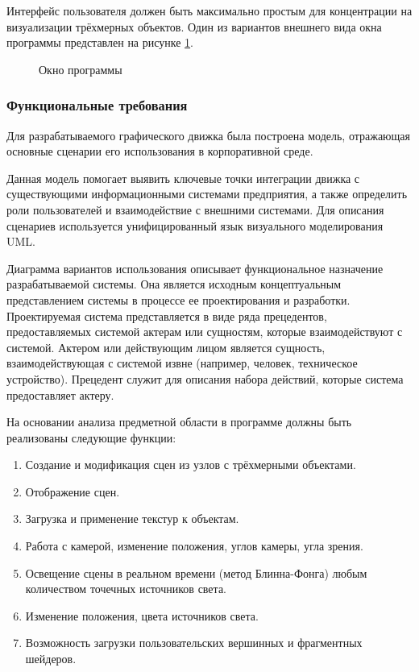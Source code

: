 Интерфейс пользователя должен быть максимально простым для концентрации на визуализации трёхмерных объектов. Один из вариантов внешнего вида окна программы представлен на рисунке \ref{interface:image}.

\begin{figure}[ht]
\caption{Окно программы}
\label{interface:image}
\end{figure}

\subsubsection{Функциональные требования}

Для разрабатываемого графического движка была построена модель, отражающая основные сценарии его использования в корпоративной среде.

Данная модель помогает выявить ключевые точки интеграции движка с существующими информационными системами предприятия, а также определить роли пользователей и взаимодействие с внешними системами. Для описания сценариев используется унифицированный язык визуального моделирования UML.

Диаграмма вариантов использования описывает функциональное назначение разрабатываемой системы. Она является исходным концептуальным представлением системы в процессе ее проектирования и разработки. Проектируемая система представляется в виде ряда прецедентов, предоставляемых системой актерам или сущностям, которые взаимодействуют с системой. Актером или действующим лицом является сущность, взаимодействующая с системой извне (например, человек, техническое устройство). Прецедент служит для описания набора действий, которые система предоставляет актеру.

На основании анализа предметной области в программе должны быть реализованы следующие функции:

\begin{enumerate}
    \item Создание и модификация сцен из узлов с трёхмерными объектами.
    \item Отображение сцен.
    \item Загрузка и применение текстур к объектам.
    \item Работа с камерой, изменение положения, углов камеры, угла зрения.
    \item Освещение сцены в реальном времени (метод Блинна-Фонга) любым количеством точечных источников света.
    \item Изменение положения, цвета источников света.
    \item Возможность загрузки пользовательских вершинных и фрагментных шейдеров.
\end{enumerate}

